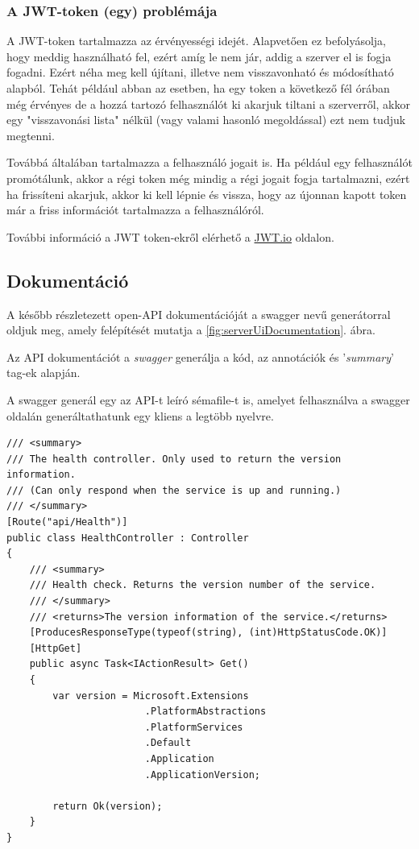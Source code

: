 \documentclass[twoside, a4paper, 12pt]{book}
\begin{document}
\subsubsection{A JWT-token (egy) problémája}
A JWT-token tartalmazza az érvényességi idejét. Alapvetően ez befolyásolja, hogy meddig használható fel, ezért amíg le nem jár, addig a szerver el is fogja fogadni. Ezért néha meg kell újítani, illetve nem visszavonható és módosítható alapból. Tehát például abban az esetben, ha egy token a következő fél órában még érvényes de a hozzá tartozó felhasználót ki akarjuk tiltani a szerverről, akkor egy "visszavonási lista" nélkül (vagy valami hasonló megoldással) ezt nem tudjuk megtenni.

Továbbá általában tartalmazza a felhasználó jogait is. Ha például egy felhasználót promótálunk, akkor a régi token még mindig a régi jogait fogja tartalmazni, ezért ha frissíteni akarjuk, akkor ki kell lépnie és vissza, hogy az újonnan kapott token már a friss információt tartalmazza a felhasználóról.

További információ a JWT token-ekről elérhető a \href{https://jwt.io/}{JWT.io} oldalon.

\subsection{Dokumentáció}
A később részletezett open-API dokumentációját a swagger nevű generátorral oldjuk meg, amely felépítését mutatja a \ref{fig:serverUiDocumentation}. ábra.

Az API dokumentációt a \textit{swagger}\cite{swaggerHomepage} generálja a kód, az annotációk és '\textit{summary}' tag-ek alapján.

A swagger generál egy az API-t leíró sémafile-t is, amelyet felhasználva a swagger oldalán generáltathatunk egy kliens a legtöbb nyelvre.

\begin{lstlisting}[caption=Health-check példakód 'summary' tag-ekkel., label=lst:healtcheck]
/// <summary>
/// The health controller. Only used to return the version information.
/// (Can only respond when the service is up and running.)
/// </summary>
[Route("api/Health")]
public class HealthController : Controller
{
	/// <summary>
	/// Health check. Returns the version number of the service.
	/// </summary>
	/// <returns>The version information of the service.</returns>
	[ProducesResponseType(typeof(string), (int)HttpStatusCode.OK)]
	[HttpGet]
	public async Task<IActionResult> Get()
	{
		var version = Microsoft.Extensions
						.PlatformAbstractions
						.PlatformServices
						.Default
						.Application
						.ApplicationVersion;

		return Ok(version);
	}
}
\end{lstlisting}
\end{document}
